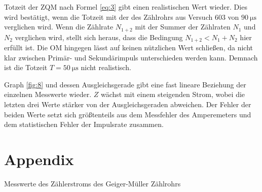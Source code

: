     \justifying Totzeit der ZQM nach Formel \eqref{eq:3} gibt einen realistischen Wert wieder. Dies wird bestätigt, wenn die Totzeit 
    mit der des Zählrohrs aus Versuch 603 von $\SI{90}{\micro\second}$ \cite{V603} verglichen wird. Wenn die Zählrate $N_{1+2}$ mit der Summer der
    Zählraten $N_1$ und $N_2$ verglichen wird, stellt sich heraus, dass die Bedingung $N_{1+2} < N_1+N_2$ hier erfüllt ist. Die OM hingegen lässt auf keinen nützlichen
    Wert schließen, da nicht klar zwischen Primär- und Sekundärimpuls unterschieden werden kann. Demnach ist die Totzeit $T=\SI{50}{\micro\second}$
    nicht realistisch. 

    \justifying Graph \ref{fig:8} und dessen Ausgleichsgerade gibt eine fast lineare Beziehung der einzelnen Messwerte wieder. 
    $Z$ wächst mit einem steigenden Strom, wobei die letzten drei Werte stärker von der Ausgleichsgeraden abweichen. Der Fehler der beiden Werte
    setzt sich größtenteils aus dem Messfehler des Amperemeters und dem statistischen Fehler der Impulsrate zusammen.

\newpage
\printbibliography

\newpage
\section{Appendix}

    

    \begin{table}[H]
        \centering
        
        \caption{Messwerte des Zählerstroms des Geiger-Müller Zählrohrs}
        \label{tab:2}
    \end{table}

